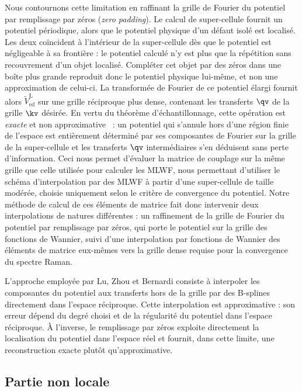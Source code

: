 Nous contournons cette limitation en raffinant la grille de Fourier du potentiel par remplissage par zéros (\textit{zero padding}). Le calcul de super-cellule fournit un potentiel périodique, alors que le potentiel physique d'un défaut isolé est localisé. Les deux coïncident à l'intérieur de la super-cellule dès que le potentiel est négligeable à sa frontière : le potentiel calculé n'y est plus que la répétition sans recouvrement d'un objet localisé. Compléter cet objet par des zéros dans une boîte plus grande reproduit donc le potentiel physique lui-même, et non une approximation de celui-ci. La transformée de Fourier de ce potentiel élargi fournit alors $\widetilde{V}_\text{ed}^\text{L}$ sur une grille réciproque plus dense, contenant les transferts $\qv$ de la grille $\kv$ désirée. En vertu du théorème d'échantillonnage, cette opération est \textit{exacte} et non approximative~\cite{shannonCommunicationPresenceNoise1949} : un potentiel qui s'annule hors d'une région finie de l'espace est entièrement déterminé par ses composantes de Fourier sur la grille de la super-cellule et les transferts $\qv$ intermédiaires s'en déduisent sans perte d'information. Ceci nous permet d'évaluer la matrice de couplage sur la même grille que celle utilisée pour calculer les MLWF, nous permettant d'utiliser le schéma d'interpolation par des MLWF à partir d'une super-cellule de taille modérée, choisie uniquement selon le critère de convergence du potentiel. Notre méthode de calcul de ces éléments de matrice fait donc intervenir deux interpolations de natures différentes : un raffinement de la grille de Fourier du potentiel par remplissage par zéros, qui porte le potentiel sur la grille des fonctions de Wannier, suivi d'une interpolation par fonctions de Wannier des éléments de matrice eux-mêmes vers la grille dense requise pour la convergence du spectre Raman.

L'approche employée par Lu, Zhou et Bernardi consiste à interpoler les composantes du potentiel aux transferts hors de la grille par des B-splines directement dans l'espace réciproque. Cette interpolation est approximative : son erreur dépend du degré choisi et de la régularité du potentiel dans l'espace réciproque. À l'inverse, le remplissage par zéros exploite directement la localisation du potentiel dans l'espace réel et fournit, dans cette limite, une reconstruction exacte plutôt qu'approximative.

\subsection{Partie non locale}\label{sec:M_non_local}


